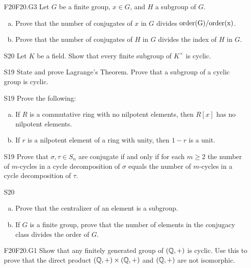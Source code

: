 \documentclass[../AlgebraQualSolutions.tex]{subfiles}
\begin{document}
	\begin{prob}{F20}{F20.G3}
	Let $G$ be a finite group, $x \in G$, and $H$ a subgroup of $G$.
	\begin{enumerate}[(a)]
	\item Prove that the number of conjugates of $x$ in $G$ divides $\rm{order}(G)/\rm{order}(x)$.
	\item Prove that the number of conjugates of $H$ in $G$ divides the index of $H$ in $G$.
	\end{enumerate}
	\end{prob}

	\begin{prob}{S20}{}
	Let $K$ be a field. Show that every finite subgroup of $K^\times$ is cyclic.
	\end{prob}

	\begin{prob}{S19}{}
	State and prove Lagrange's Theorem. Prove that a subgroup of a cyclic group is cyclic.
	\end{prob}

	\begin{prob}{S19}{}
	Prove the following:
	\begin{enumerate}[(a)]
	\item If $R$ is a commutative ring with no nilpotent elements, then $R[x]$ has no nilpotent elements.
	\item If $r$ is a nilpotent element of a ring with unity, then $1 - r$ is a unit.
	\end{enumerate}
	\end{prob}
	

	
	\begin{prob}{S19}{}
	Prove that $\sigma,\tau \in S_n$ are conjugate if and only if for each $m \geq 2$ the number of $m$-cycles in a cycle decomposition of $\sigma$ equals the number of $m$-cycles in a cycle decomposition of $\tau$.
	\end{prob}
	
	\begin{prob}{S20}{}
	\begin{enumerate}[(a)]
	\item Prove that the centralizer of an element is a subgroup.
	\item If $G$ is a finite group, prove that the number of elements in the conjugacy class divides the order of $G$.
	\end{enumerate}
	\end{prob}
	
	\begin{prob}{F20}{F20.G1}
	Show that any finitely generated group of $(\mathbb{Q},+)$ is cyclic. Use this to prove that the direct product $(\mathbb{Q},+) \times (\mathbb{Q},+)$ and $(\mathbb{Q},+)$ are not isomorphic.
	\end{prob}
\end{document}
